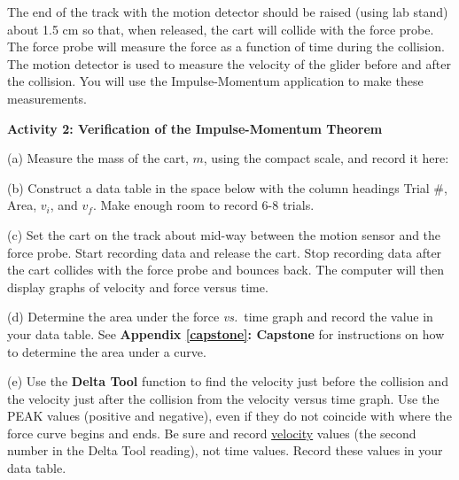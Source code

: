 The end of the track with the motion detector should be raised (using lab stand) 
about 1.5 cm so that, when released, the cart will collide with the force probe. 
The force probe will measure the force as a function of time during the collision. 
The motion detector is used to measure the velocity of the glider before and after the 
collision. You will use the Impulse-Momentum application to make these measurements.

\vspace{0.3cm}
{\par\centering {} \par}
\vspace{0.3cm}

\textbf{Activity 2: Verification of the Impulse-Momentum Theorem} 

(a) Measure the mass of the cart, $m$, using the compact scale, and record it here:
\vspace{10mm}

(b) Construct a data table in the space below with the column headings Trial
\#, Area, \( v_{i} \), and \( v_{f} \). Make enough room to record 6-8 trials.

\newpage


(c) Set the cart on the track about mid-way between the motion sensor and the force probe. Start recording data and release the cart. Stop recording data after the cart collides with the force probe and bounces back. The computer will then display graphs of velocity and force versus time.

(d) Determine the area under the force \textit{vs.}~time graph and record the value in
your data table. See \textbf{Appendix \ref{capstone}: Capstone} for instructions on how to determine the area under a curve.

(e) Use the \textbf{Delta Tool} function to find the velocity just before the collision and the
velocity just after the collision from the velocity versus time graph. Use the 
PEAK values (positive and negative), even if they do not coincide with where 
the force curve begins and ends. Be sure and record \underline{velocity} values 
(the second number in the Delta Tool reading), not time values. 
Record these values in your data table.

